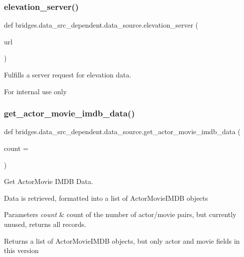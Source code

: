 \subsubsection{\texorpdfstring{elevation\+\_\+server()}{elevation\_server()}}
{\footnotesize\ttfamily def bridges.\+data\+\_\+src\+\_\+dependent.\+data\+\_\+source.\+elevation\+\_\+server (\begin{DoxyParamCaption}\item[{}]{url }\end{DoxyParamCaption})}



Fulfills a server request for elevation data. 

For internal use only \mbox{\label{namespacebridges_1_1data__src__dependent_1_1data__source_af749e618490362a6050faa57c874e487}} 
\subsubsection{\texorpdfstring{get\+\_\+actor\+\_\+movie\+\_\+imdb\+\_\+data()}{get\_actor\_movie\_imdb\_data()}}
{\footnotesize\ttfamily def bridges.\+data\+\_\+src\+\_\+dependent.\+data\+\_\+source.\+get\+\_\+actor\+\_\+movie\+\_\+imdb\+\_\+data (\begin{DoxyParamCaption}\item[{}]{count = {} }\end{DoxyParamCaption})}



Get Actor\+Movie I\+M\+DB Data. 

Data is retrieved, formatted into a list of Actor\+Movie\+I\+M\+DB objects


\begin{DoxyParams}{Parameters}
{\em count} & count of the number of actor/movie pairs, but currently unused, returns all records.\\
\hline
\end{DoxyParams}
\begin{DoxyReturn}{Returns}
a list of Actor\+Movie\+I\+M\+DB objects, but only actor and movie fields in this version 
\end{DoxyReturn}

